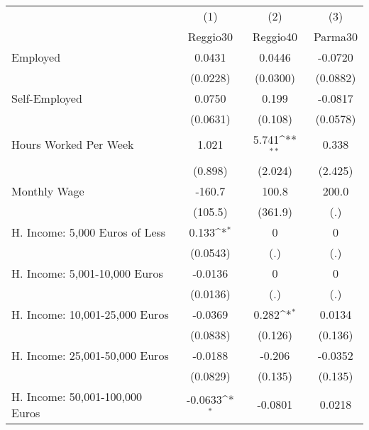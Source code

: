 {
\def\sym#1{\ifmmode^{#1}\else\(^{#1}\)\fi}
\begin{tabular}{l*{3}{c}}
\hline\hline
            &\multicolumn{1}{c}{(1)}&\multicolumn{1}{c}{(2)}&\multicolumn{1}{c}{(3)}\\
            &\multicolumn{1}{c}{Reggio30}&\multicolumn{1}{c}{Reggio40}&\multicolumn{1}{c}{Parma30}\\
\hline
Employed    &      0.0431         &      0.0446         &     -0.0720         \\
            &    (0.0228)         &    (0.0300)         &    (0.0882)         \\
[1em]
Self-Employed&      0.0750         &       0.199         &     -0.0817         \\
            &    (0.0631)         &     (0.108)         &    (0.0578)         \\
[1em]
Hours Worked Per Week&       1.021         &       5.741\sym{**} &       0.338         \\
            &     (0.898)         &     (2.024)         &     (2.425)         \\
[1em]
Monthly Wage&      -160.7         &       100.8         &       200.0         \\
            &     (105.5)         &     (361.9)         &         (.)         \\
[1em]
H. Income: 5,000 Euros of Less&       0.133\sym{*}  &           0         &           0         \\
            &    (0.0543)         &         (.)         &         (.)         \\
[1em]
H. Income: 5,001-10,000 Euros&     -0.0136         &           0         &           0         \\
            &    (0.0136)         &         (.)         &         (.)         \\
[1em]
H. Income: 10,001-25,000 Euros&     -0.0369         &       0.282\sym{*}  &      0.0134         \\
            &    (0.0838)         &     (0.126)         &     (0.136)         \\
[1em]
H. Income: 25,001-50,000 Euros&     -0.0188         &      -0.206         &     -0.0352         \\
            &    (0.0829)         &     (0.135)         &     (0.135)         \\
[1em]
H. Income: 50,001-100,000 Euros&     -0.0633\sym{*}  &     -0.0801         &      0.0218         \\

\end{tabular}}
